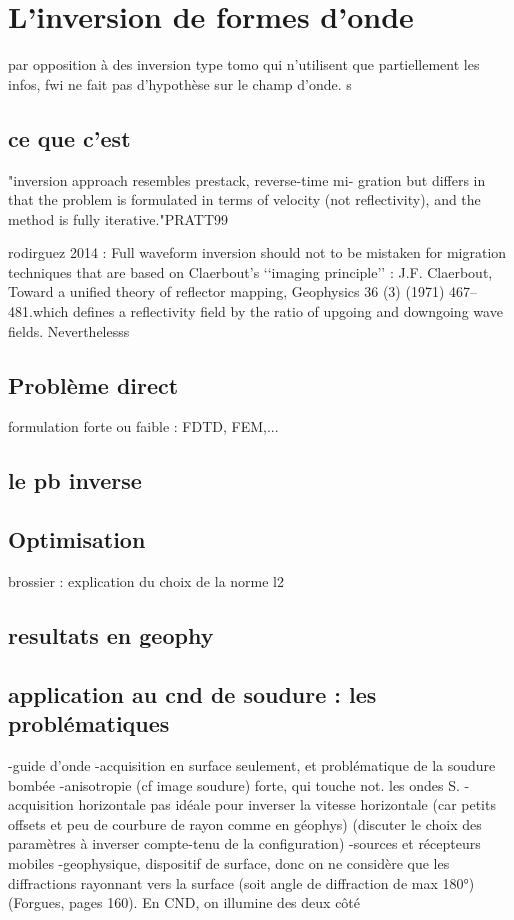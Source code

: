 \chapter{L'inversion de formes d'onde \label{fwi}}
par opposition à des inversion type tomo qui n'utilisent que partiellement les infos, fwi ne fait pas d'hypothèse sur le champ d'onde. s


\section{ce que c'est}
"inversion approach resembles prestack, reverse-time mi-
gration but differs in that the problem is formulated in
terms of velocity (not reflectivity), and the method is
fully iterative."PRATT99

rodirguez 2014 : Full waveform
inversion should not to be mistaken for migration techniques that
are based on Claerbout’s ‘‘imaging principle’’ : J.F. Claerbout, Toward a unified theory of reflector mapping, Geophysics 36 (3)
(1971) 467–481.which defines a
reflectivity field by the ratio of upgoing and downgoing wave
fields. Neverthelesss

\section{Problème direct}
formulation forte ou faible : 
FDTD, FEM,...

\section{le pb inverse}

\section{Optimisation}

brossier : explication du choix de la norme l2


\section{resultats en geophy}

\section{application au cnd de soudure : les problématiques}

-guide d'onde
-acquisition en surface seulement, et problématique de la soudure bombée
-anisotropie (cf image soudure) forte, qui touche not. les ondes S.
-acquisition horizontale pas idéale pour inverser la vitesse horizontale (car petits offsets et peu de courbure de rayon comme en géophys) (discuter le choix des paramètres à inverser compte-tenu de la configuration)
-sources et récepteurs mobiles 
-geophysique, dispositif de surface, donc on ne considère que les diffractions rayonnant vers la surface (soit angle de diffraction de max 180°)(Forgues, pages 160). En CND, on illumine des deux côté


